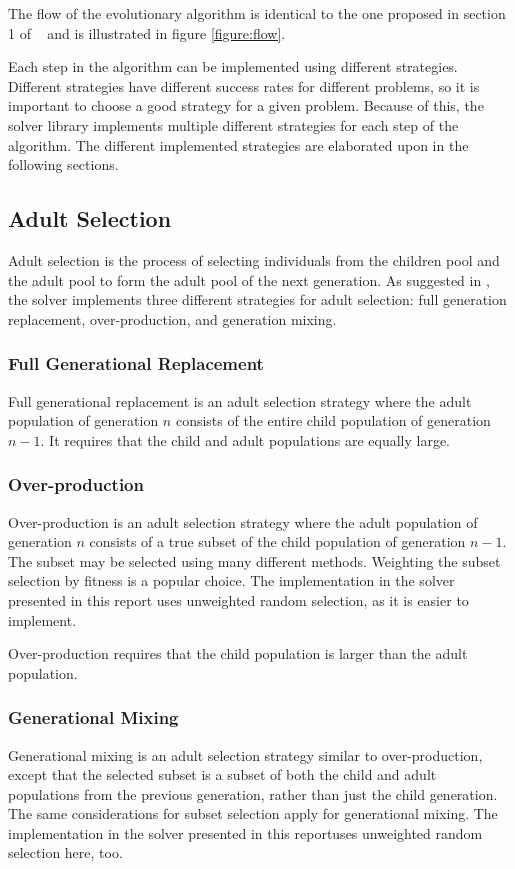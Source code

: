 \documentclass[twocolumn,oneside]{amsart}
\begin{document}
The flow of the evolutionary algorithm is identical to the one proposed in section 1 of ~\cite{ea-appendices} and is illustrated in figure \ref{figure:flow}.

Each step in the algorithm can be implemented using different strategies.
Different strategies have different success rates for different problems, so it is important to choose a good strategy for a given problem.
Because of this, the solver library implements multiple different strategies for each step of the algorithm.
The different implemented strategies are elaborated upon in the following sections.

\subsection{Adult Selection}
Adult selection is the process of selecting individuals from the children pool and the adult pool to form the adult pool of the next generation.
As suggested in \cite{ea-appendices}, the solver implements three different strategies for adult selection: full generation replacement, over-production, and generation mixing.

\subsubsection{Full Generational Replacement}
Full generational replacement is an adult selection strategy where the adult population of generation $ n $ consists of the entire child population of generation $ n - 1 $.
It requires that the child and adult populations are equally large.

\subsubsection{Over-production}
Over-production is an adult selection strategy where the adult population of generation $ n $ consists of a true subset of the child population of generation $ n - 1 $.
The subset may be selected using many different methods.
Weighting the subset selection by fitness is a popular choice.
The implementation in the solver presented in this report uses unweighted random selection, as it is easier to implement.

Over-production requires that the child population is larger than the adult population.

\subsubsection{Generational Mixing}
Generational mixing is an adult selection strategy similar to over-production, except that the selected subset is a subset of both the child and adult populations from the previous generation, rather than just the child generation.
The same considerations for subset selection apply for generational mixing.
The implementation in the solver presented in this reportuses unweighted random selection here, too.
\end{document}
